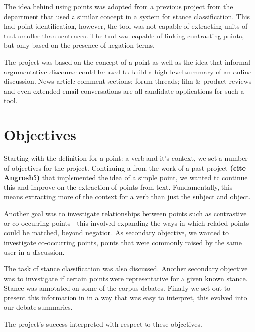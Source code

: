     The idea behind using points was adopted from a previous project from the department that used a similar concept in a system for stance classification. This had point identification, however, the tool was not capable of extracting units of text smaller than sentences. The tool was capable of linking contrasting points, but only based on the presence of negation terms.

    The project was based on the concept of a point as well as the idea that informal argumentative discourse could be used to build a high-level summary of an online discussion. News article comment sections; forum threads; film \& product reviews and even extended email conversations are all candidate applications for such a tool.

  \section{Objectives}
    Starting with the definition for a point: a verb and it's context, we set a number of objectives for the project. Continuing a from the work of a past project \textbf{(cite Angrosh?)} that implemented the idea of a simple point, we wanted to continue this and improve on the extraction of points from text. Fundamentally, this means extracting more of the context for a verb than just the subject and object.

    Another goal was to investigate relationships between points such as contrastive or co-occurring points - this involved expanding the ways in which related points could be matched, beyond negation. As secondary objective, we wanted to investigate co-occurring points, points that were commonly raised by the same user in a discussion.

    The task of stance classification was also discussed. Another secondary objective was to investigate if certain points were representative for a given known stance. Stance was annotated on some of the corpus debates. Finally we set out to present this information in in a way that was easy to interpret, this evolved into our debate summaries.

    The project's success interpreted with respect to these objectives.
